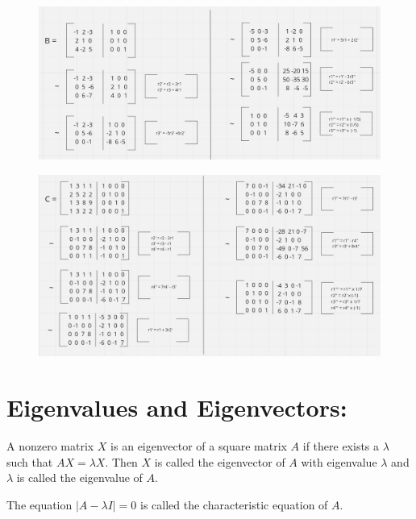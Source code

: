 \documentclass{article}
\begin{document}
    \begin{figure}[htbp]
        \centering
        \includegraphics[width=1.2\textwidth, height=.7\textheight]{../Asset/invHWB.png}
        \label{fig:example}
    \end{figure}
    \begin{figure}[htbp]
        \centering
        \includegraphics[width=1.2\textwidth, height=.7\textheight]{../Asset/invHWC.png}
        \label{fig:example}
    \end{figure}

    \newpage
    \section*{Eigenvalues and Eigenvectors:}
    
    \vspace{10pt}
    A nonzero matrix \( X \) is an eigenvector of a square matrix \( A \) if there exists a \( \lambda \) such that \( AX = \lambda X \). Then \( X \) is called the eigenvector of \( A \) with eigenvalue \( \lambda \) and \( \lambda \) is called the eigenvalue of \( A \).
    
    \vspace{10pt}
    The equation \( |A - \lambda I| = 0\) is called the characteristic equation of \( A \).
    
\end{document}
